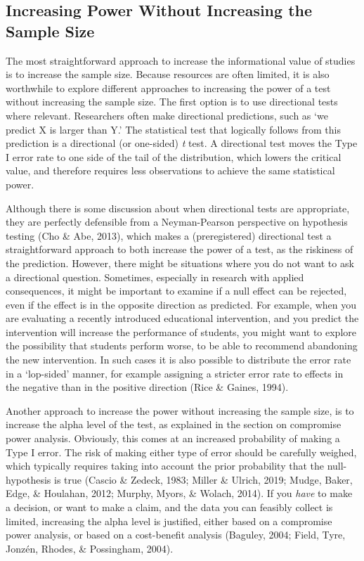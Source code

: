 \documentclass[
  english,
  ,jou,floatsintext]{apa6}
\begin{document}
\hypertarget{increasing-power-without-increasing-the-sample-size}{%
\subsection{Increasing Power Without Increasing the Sample Size}\label{increasing-power-without-increasing-the-sample-size}}

The most straightforward approach to increase the informational value of studies is to increase the sample size. Because resources are often limited, it is also worthwhile to explore different approaches to increasing the power of a test without increasing the sample size. The first option is to use directional tests where relevant. Researchers often make directional predictions, such as `we predict X is larger than Y.' The statistical test that logically follows from this prediction is a directional (or one-sided) \emph{t} test. A directional test moves the Type I error rate to one side of the tail of the distribution, which lowers the critical value, and therefore requires less observations to achieve the same statistical power.

Although there is some discussion about when directional tests are appropriate, they are perfectly defensible from a Neyman-Pearson perspective on hypothesis testing (Cho \& Abe, 2013), which makes a (preregistered) directional test a straightforward approach to both increase the power of a test, as the riskiness of the prediction. However, there might be situations where you do not want to ask a directional question. Sometimes, especially in research with applied consequences, it might be important to examine if a null effect can be rejected, even if the effect is in the opposite direction as predicted. For example, when you are evaluating a recently introduced educational intervention, and you predict the intervention will increase the performance of students, you might want to explore the possibility that students perform worse, to be able to recommend abandoning the new intervention. In such cases it is also possible to distribute the error rate in a `lop-sided' manner, for example assigning a stricter error rate to effects in the negative than in the positive direction (Rice \& Gaines, 1994).

Another approach to increase the power without increasing the sample size, is to increase the alpha level of the test, as explained in the section on compromise power analysis. Obviously, this comes at an increased probability of making a Type I error. The risk of making either type of error should be carefully weighed, which typically requires taking into account the prior probability that the null-hypothesis is true (Cascio \& Zedeck, 1983; Miller \& Ulrich, 2019; Mudge, Baker, Edge, \& Houlahan, 2012; Murphy, Myors, \& Wolach, 2014). If you \emph{have} to make a decision, or want to make a claim, and the data you can feasibly collect is limited, increasing the alpha level is justified, either based on a compromise power analysis, or based on a cost-benefit analysis (Baguley, 2004; Field, Tyre, Jonzén, Rhodes, \& Possingham, 2004).
\end{document}
